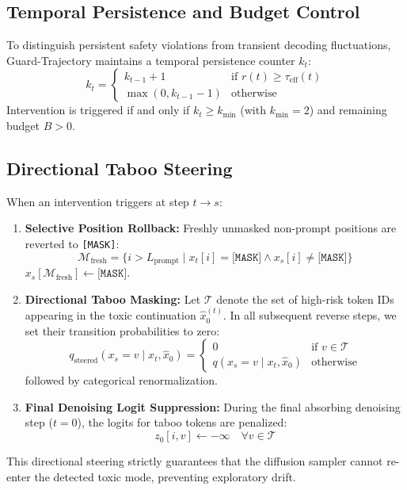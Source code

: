 \documentclass[conference]{IEEEtran}
\begin{document}
\subsection{Temporal Persistence and Budget Control}
To distinguish persistent safety violations from transient decoding fluctuations, Guard-Trajectory maintains a temporal persistence counter $k_t$:
\begin{equation}
k_t = \begin{cases}
k_{t-1} + 1 & \text{if } r(t) \ge \tau_{\text{eff}}(t) \\
\max(0, k_{t-1} - 1) & \text{otherwise}
\end{cases}
\end{equation}
Intervention is triggered if and only if $k_t \ge k_{\min}$ (with $k_{\min}=2$) and remaining budget $B > 0$.

\subsection{Directional Taboo Steering}
When an intervention triggers at step $t \to s$:
\begin{enumerate}
    \item \textbf{Selective Position Rollback:} Freshly unmasked non-prompt positions are reverted to \texttt{[MASK]}:
    \begin{equation}
    \mathcal{M}_{\text{fresh}} = \{ i > L_{\text{prompt}} \mid x_t[i] = \texttt{[MASK]} \land x_s[i] \ne \texttt{[MASK]} \}
    \end{equation}
    $x_s[\mathcal{M}_{\text{fresh}}] \leftarrow \texttt{[MASK]}$.
    \item \textbf{Directional Taboo Masking:} Let $\mathcal{T}$ denote the set of high-risk token IDs appearing in the toxic continuation $\hat{x}_0^{(t)}$. In all subsequent reverse steps, we set their transition probabilities to zero:
    \begin{equation}
    q_{\text{steered}}(x_s = v \mid x_t, \hat{x}_0) = \begin{cases}
    0 & \text{if } v \in \mathcal{T} \\
    q(x_s = v \mid x_t, \hat{x}_0) & \text{otherwise}
    \end{cases}
    \end{equation}
    followed by categorical renormalization.
    \item \textbf{Final Denoising Logit Suppression:} During the final absorbing denoising step ($t=0$), the logits for taboo tokens are penalized:
    \begin{equation}
    z_0[i, v] \leftarrow -\infty \quad \forall v \in \mathcal{T}
    \end{equation}
\end{enumerate}
This directional steering strictly guarantees that the diffusion sampler cannot re-enter the detected toxic mode, preventing exploratory drift.
\end{document}
